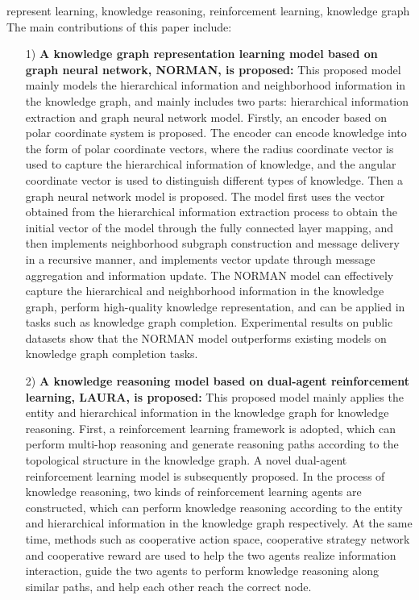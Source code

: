\documentclass[algorithmlist, AutoFakeBold, AutoFakeSlant, figurelist, tablelist, nomlist, engineering]{seuthesix}
\begin{document}
\begin{englishabstract}{represent learning, knowledge reasoning, reinforcement learning, knowledge graph}
  The main contributions of this paper include:
  \begin{itemize}
    \item [1)]\textbf{A knowledge graph representation learning model based on graph neural network, NORMAN, is proposed:}
    This proposed model mainly models the hierarchical information and neighborhood information in the knowledge graph, and mainly includes two parts: hierarchical information extraction and graph neural network model.
    Firstly, an encoder based on polar coordinate system is proposed. The encoder can encode knowledge into the form of polar coordinate vectors, where the radius coordinate vector is used to capture the hierarchical information of knowledge, and the angular coordinate vector is used to distinguish different types of knowledge.
    Then a graph neural network model is proposed. The model first uses the vector obtained from the hierarchical information extraction process to obtain the initial vector of the model through the fully connected layer mapping, and then implements neighborhood subgraph construction and message delivery in a recursive manner, and implements vector update through message aggregation and information update.
    The NORMAN model can effectively capture the hierarchical and neighborhood information in the knowledge graph, perform high-quality knowledge representation, and can be applied in tasks such as knowledge graph completion.
    Experimental results on public datasets show that the NORMAN model outperforms existing models on knowledge graph completion tasks.
    \item [2)]\textbf{A knowledge reasoning model based on dual-agent reinforcement learning, LAURA, is proposed:}
    This proposed model mainly applies the entity and hierarchical information in the knowledge graph for knowledge reasoning.
    First, a reinforcement learning framework is adopted, which can perform multi-hop reasoning and generate reasoning paths according to the topological structure in the knowledge graph.
    A novel dual-agent reinforcement learning model is subsequently proposed. In the process of knowledge reasoning, two kinds of reinforcement learning agents are constructed, which can perform knowledge reasoning according to the entity and hierarchical information in the knowledge graph respectively. At the same time, methods such as cooperative action space, cooperative strategy network and cooperative reward are used to help the two agents realize information interaction, guide the two agents to perform knowledge reasoning along similar paths, and help each other reach the correct node.

\end{itemize}
\end{englishabstract}
\end{document}
